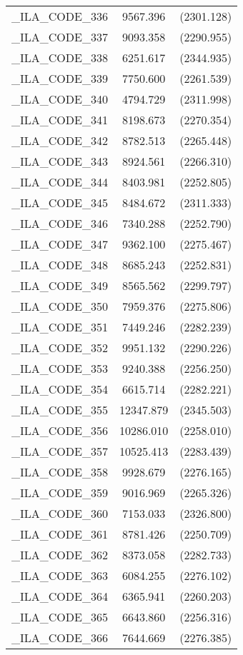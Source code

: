 {\begin{table}[htbp]
\begin{tabular}{l c c }
\_ILA\_CODE\_336  &  9567.396  & (2301.128)\\
\_ILA\_CODE\_337  &  9093.358  & (2290.955)\\
\_ILA\_CODE\_338  &  6251.617  & (2344.935)\\
\_ILA\_CODE\_339  &  7750.600  & (2261.539)\\
\_ILA\_CODE\_340  &  4794.729  & (2311.998)\\
\_ILA\_CODE\_341  &  8198.673  & (2270.354)\\
\_ILA\_CODE\_342  &  8782.513  & (2265.448)\\
\_ILA\_CODE\_343  &  8924.561  & (2266.310)\\
\_ILA\_CODE\_344  &  8403.981  & (2252.805)\\
\_ILA\_CODE\_345  &  8484.672  & (2311.333)\\
\_ILA\_CODE\_346  &  7340.288  & (2252.790)\\
\_ILA\_CODE\_347  &  9362.100  & (2275.467)\\
\_ILA\_CODE\_348  &  8685.243  & (2252.831)\\
\_ILA\_CODE\_349  &  8565.562  & (2299.797)\\
\_ILA\_CODE\_350  &  7959.376  & (2275.806)\\
\_ILA\_CODE\_351  &  7449.246  & (2282.239)\\
\_ILA\_CODE\_352  &  9951.132  & (2290.226)\\
\_ILA\_CODE\_353  &  9240.388  & (2256.250)\\
\_ILA\_CODE\_354  &  6615.714  & (2282.221)\\
\_ILA\_CODE\_355  &  12347.879  & (2345.503)\\
\_ILA\_CODE\_356  &  10286.010  & (2258.010)\\
\_ILA\_CODE\_357  &  10525.413  & (2283.439)\\
\_ILA\_CODE\_358  &  9928.679  & (2276.165)\\
\_ILA\_CODE\_359  &  9016.969  & (2265.326)\\
\_ILA\_CODE\_360  &  7153.033  & (2326.800)\\
\_ILA\_CODE\_361  &  8781.426  & (2250.709)\\
\_ILA\_CODE\_362  &  8373.058  & (2282.733)\\
\_ILA\_CODE\_363  &  6084.255  & (2276.102)\\
\_ILA\_CODE\_364  &  6365.941  & (2260.203)\\
\_ILA\_CODE\_365  &  6643.860  & (2256.316)\\
\_ILA\_CODE\_366  &  7644.669  & (2276.385)\\

\end{tabular}
\end{table}}
